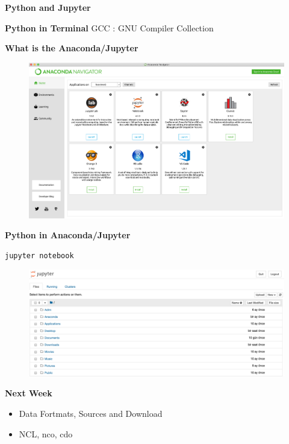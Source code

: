 \documentclass[ignorenonframetext,]{beamer}
\begin{document}
\begin{frame}[fragile]{\textbf{Python and Jupyter}}
\begin{block}{\textbf{Python in Terminal}}
GCC : GNU Compiler Collection

\end{block}

\begin{block}{\textbf{What is the Anaconda/Jupyter}}

\begin{figure}
\centering
\includegraphics{conda.png}
\caption{}
\end{figure}

\end{block}

\begin{block}{\textbf{Python in Anaconda/Jupyter}}

\begin{verbatim}
jupyter notebook
\end{verbatim}

\begin{figure}
\centering
\includegraphics{jupyter_notebook.png}
\caption{}
\end{figure}

\end{block}

\end{frame}

\begin{frame}{\textbf{Next Week}}

\begin{itemize}
\item
  Data Fortmats, Sources and Download
\item
  NCL, nco, cdo
\end{itemize}

\end{frame}
\end{document}

